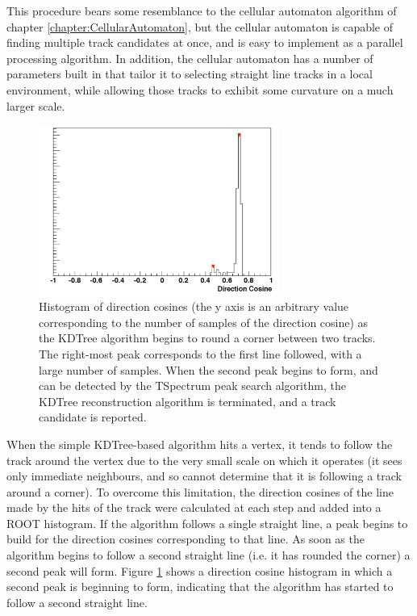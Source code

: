 This procedure bears some resemblance to the cellular automaton algorithm of chapter \ref{chapter:CellularAutomaton}, but the cellular automaton is capable of finding multiple track candidates at once, and is easy to implement as a parallel processing algorithm. In addition, the cellular automaton has a number of parameters built in that tailor it to selecting straight line tracks in a local environment, while allowing those tracks to exhibit some curvature on a much larger scale.

\begin{figure}
    \centering
    \includegraphics[width=0.7\textwidth]{chapters/otheralg_images/kdtree-peaks}
    \caption{\label{fig:kdtree_peaks}Histogram of direction cosines (the y axis is an arbitrary value corresponding to the number of samples of the direction cosine) as the KDTree algorithm begins to round a corner between two tracks. The right-most peak corresponds to the first line followed, with a large number of samples. When the second peak begins to form, and can be detected by the TSpectrum peak search algorithm, the KDTree reconstruction algorithm is terminated, and a track candidate is reported.}
\end{figure}

When the simple KDTree-based algorithm hits a vertex, it tends to follow the track around the vertex due to the very small scale on which it operates (it sees only immediate neighbours, and so cannot determine that it is following a track around a corner). To overcome this limitation, the direction cosines of the line made by the hits of the track were calculated at each step and added into a ROOT histogram. If the algorithm follows a single straight line, a peak begins to build for the direction cosines corresponding to that line. As soon as the algorithm begins to follow a second straight line (i.e. it has rounded the corner) a second peak will form. Figure \ref{fig:kdtree_peaks} shows a direction cosine histogram in which a second peak is beginning to form, indicating that the algorithm has started to follow a second straight line.

